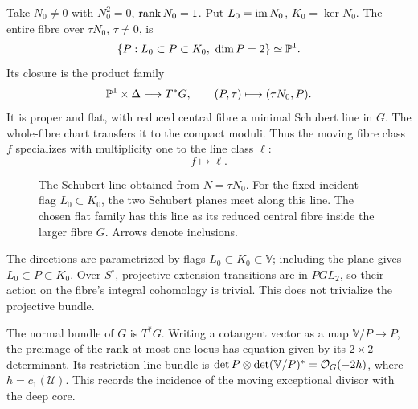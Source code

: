 Take \(N_0\ne0\) with \(N_0^2=0\), \(\operatorname{rank} N_0=1\).
Put \(L_0=\operatorname{im} N_0\), \(K_0=\ker N_0\).
The entire fibre over \(\tau N_0\), \(\tau\ne0\), is
\[
 \{P:L_0\subset P\subset K_0,\ \dim P=2\}\simeq\mathbb P^1.
\]
Its closure is the product family
\[
 \mathbb P^1\times\Delta\longrightarrow T^*G,\qquad
 (P,\tau)\longmapsto(\tau N_0,P).
\]
It is proper and flat, with reduced central fibre a minimal
Schubert line in \(G\). The whole-fibre chart transfers it to
the compact moduli. Thus the moving fibre class \(f\) specializes
with multiplicity one to the line class \(\ell\):
\begin{equation}\label{eq:line-specialization}
 f\longmapsto\ell .
\end{equation}
\begin{figure}[tb]
 \centering
 
 \caption{The Schubert line obtained from \(N=\tau N_0\).
 For the fixed incident flag \(L_0\subset K_0\), the two
 Schubert planes meet along this line. The chosen flat family
 has this line as its reduced central fibre inside the larger
 fibre \(G\). Arrows denote inclusions.}
 \label{fig:schubert}
\end{figure}
The directions are parametrized by flags
\(L_0\subset K_0\subset\mathbb V\); including the plane gives
\(L_0\subset P\subset K_0\).
Over \(S^\circ\), projective extension transitions are in
\(PGL_2\), so their action on the fibre's integral cohomology
is trivial. This does not trivialize the projective bundle.

The normal bundle of \(G\) is \(T^*G\).
Writing a cotangent vector as a map
\(\mathbb V/P\to P\), the preimage of the rank-at-most-one locus has
equation given by its \(2\times2\) determinant.
Its restriction line bundle is
\(\det P\otimes\det(\mathbb V/P)^*=\mathcal O_G(-2h)\), where
\(h=c_1(\mathcal U)\). This records the incidence of the moving
exceptional divisor with the deep core.
